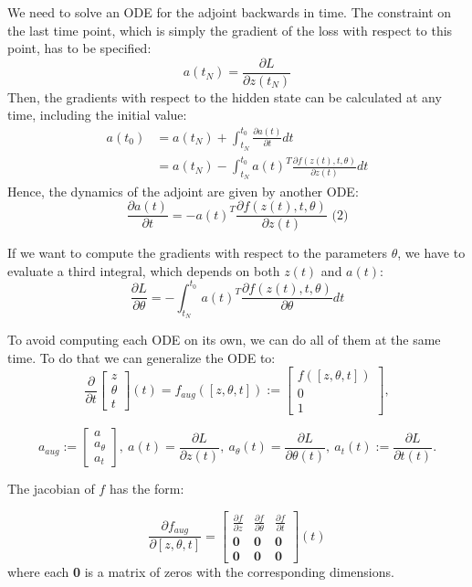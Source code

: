 \documentclass[10pt,a4paper]{article}
\theoremstyle{definition}
\theoremstyle{definition}
\theoremstyle{definition}
\begin{document}
We need to solve an ODE for the adjoint backwards in time. The constraint on the last time point, which is simply the gradient of the loss with respect to this point, has to be specified:
$$
a(t_N) = \frac{\partial L}{\partial z(t_N)}
$$
Then, the gradients with respect to the hidden state can be calculated at any time, including the initial value:
\begin{align*}
a(t_0) &= a(t_N) + \int^{t_0}_{t_N} \frac{\partial a(t)}{\partial t} dt\\
&= a(t_N) - \int^{t_0}_{t_N} a(t)^T \frac{\partial f(z(t),t,\theta)} {\partial z(t)} dt
\end{align*}
Hence, the dynamics of the adjoint are given by another ODE:
$$
\frac{\partial a(t)}{\partial t} = -a(t)^T \frac{\partial f(z(t),t,\theta)} {\partial z(t)} \text{ (2)}
$$

If we want to compute the gradients with respect to the parameters $\theta$, we have to evaluate a third integral, which depends on both $z(t)$ and $a(t)$:
$$
\frac{\partial L}{\partial \theta} = - \int^{t_0}_{t_N} a(t)^T \frac{\partial f(z(t),t,\theta)} {\partial \theta} dt
$$


To avoid computing each ODE on its own, we can do all of them at the same time. To do that we can generalize the ODE to:
$$
\frac{\partial}{\partial t} \begin{bmatrix}
							z \\ \theta \\ t
							\end{bmatrix} (t) 
= f_{aug}([z,\theta ,t]) := \begin{bmatrix}
							f([z,\theta ,t]) \\ 0 \\ 1
							\end{bmatrix},
$$

$$
a_{aug} := \begin{bmatrix}
			a \\ a_{\theta} \\ a_t
			\end{bmatrix}, \ 
a(t) = \frac{\partial L}{\partial z(t)}, \ 
a_\theta (t) = \frac{\partial L}{\partial \theta (t)}, \ 
a_t(t) := \frac{\partial L}{\partial t(t)}.
$$

The jacobian of $f$ has the form:

$$
\frac{\partial f_{aug}}{\partial [z,\theta,t]} = \begin{bmatrix}
\frac{\partial f}{\partial z} & \frac{\partial f}{\partial \theta} & \frac{\partial f}{\partial t} \\
\textbf{0} & \textbf{0} & \textbf{0} \\
\textbf{0} & \textbf{0} & \textbf{0}
\end{bmatrix}(t)
$$
where each \textbf{0} is a matrix of zeros with the corresponding dimensions.
\end{document}
